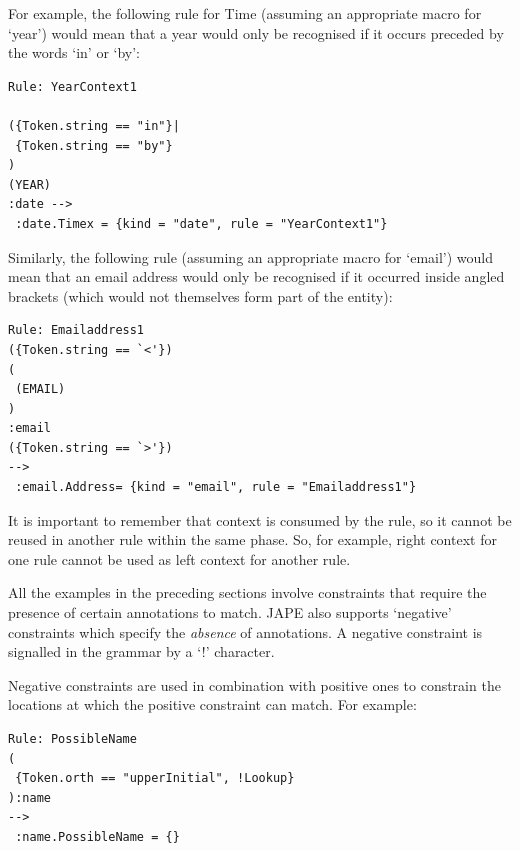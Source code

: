 For example, the following rule for Time (assuming an appropriate
macro for `year') would mean that a year would only
be recognised if it occurs preceded by the words `in' or `by':

\begin{small}
\begin{verbatim}
Rule: YearContext1

({Token.string == "in"}|
 {Token.string == "by"}
)
(YEAR)
:date -->
 :date.Timex = {kind = "date", rule = "YearContext1"}
\end{verbatim}
\end{small}

Similarly, the following rule (assuming an appropriate macro for
`email') would mean that an email address would
only be recognised if it occurred inside angled brackets (which would
not themselves form part of the entity):

\begin{small}
\begin{verbatim}
Rule: Emailaddress1
({Token.string == `<'})
(
 (EMAIL)
)
:email
({Token.string == `>'})
-->
 :email.Address= {kind = "email", rule = "Emailaddress1"}
\end{verbatim}
\end{small}


It is important to remember that context is consumed by the rule, so it cannot
be reused in another rule within the same phase. So, for example, right context
for one rule cannot be used as left context for another rule.


All the examples in the preceding sections involve constraints that require the
presence of certain annotations to match.  JAPE also supports `negative'
constraints which specify the \emph{absence} of annotations.  A negative
constraint is signalled in the grammar by a `!' character.

Negative constraints are used in combination with positive ones to constrain
the locations at which the positive constraint can match.  For example:

\begin{small}
\begin{verbatim}
Rule: PossibleName
(
 {Token.orth == "upperInitial", !Lookup}
):name
-->
 :name.PossibleName = {}
\end{verbatim}
\end{small}

